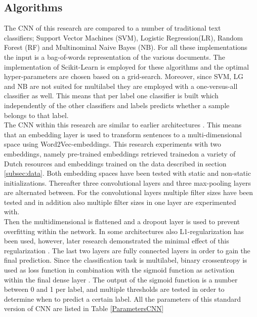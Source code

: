 \subsection{Algorithms}
The CNN of this research are compared to a number of traditional text classifiers; Support Vector Machines (SVM), Logistic Regression(LR), Random Forest (RF) and Multinominal Naive Bayes (NB). For all these implementations the input is a bag-of-words representation of the various documents. The implementation of Scikit-Learn is employed for these algorithms and the optimal hyper-parameters are chosen based on a grid-search. Moreover, since SVM, LG and NB are not suited for multilabel they are employed with a one-versus-all classifier as well. This means that per label one classifier is built which independently of the other classifiers and labels predicts whether a sample belongs to that label.  \\
The CNN within this research are similar to earlier architectures \cite{kim2014convolutional}. This means that an embedding layer is used to transform sentences to a multi-dimensional space using Word2Vec-embeddings. This research experiments with two embeddings, namely pre-trained embeddings retrieved trainedon a variety of Dutch resources \cite{tulkens2016evaluating} and embeddings trained on the data described in section \ref{subsec:data}. Both embedding spaces have been tested with static and non-static initializations. Thereafter three convolutional layers and three max-pooling layers are alternated between. For the convolutional layers multiple filter sizes have been tested and in addition also multiple filter sizes in one layer are experimented with.\\
Then the multidimensional is flattened and a dropout layer is used to prevent overfitting within the network. In some architectures also L1-regularization has been used, however, later research demonstrated the minimal effect of this regularization \cite{zhang2015sensitivity}. The last two layers are fully connected layers in order to gain the final prediction. Since the classification task is multilabel, binary crossentropy is used as loss function in combination with the sigmoid function as activation within the final dense layer \cite{nam2014large}. The output of the sigmoid function is a number between 0 and 1 per label, and multiple thresholds are tested in order to determine when to predict a certain label. All the parameters of this standard version of CNN are listed in Table \ref{ParametersCNN}\\


